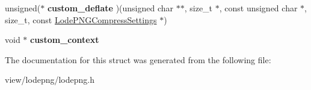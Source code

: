 \begin{DoxyCompactItemize}
\item 
\hypertarget{struct_lode_p_n_g_compress_settings_ae0d6adc268768bce7e9117f3e0f2191a}{unsigned($\ast$ {\bfseries custom\-\_\-deflate} )(unsigned char $\ast$$\ast$, size\-\_\-t $\ast$, const unsigned char $\ast$, size\-\_\-t, const \hyperlink{struct_lode_p_n_g_compress_settings}{Lode\-P\-N\-G\-Compress\-Settings} $\ast$)}\label{struct_lode_p_n_g_compress_settings_ae0d6adc268768bce7e9117f3e0f2191a}

\item 
\hypertarget{struct_lode_p_n_g_compress_settings_a04bda70a2bfb3ca23b26223405c4dd22}{void $\ast$ {\bfseries custom\-\_\-context}}\label{struct_lode_p_n_g_compress_settings_a04bda70a2bfb3ca23b26223405c4dd22}

\end{DoxyCompactItemize}


The documentation for this struct was generated from the following file\-:\begin{DoxyCompactItemize}
\item 
view/lodepng/lodepng.\-h\end{DoxyCompactItemize}
